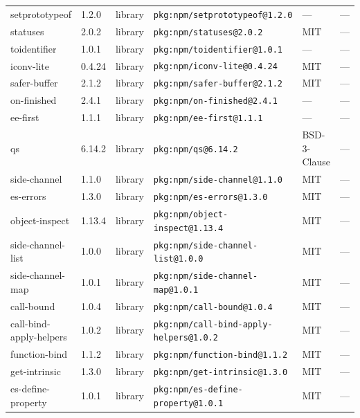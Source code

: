 \documentclass[11pt,a4paper]{article}
\begin{document}
\begin{longtable}{|p{4cm}|p{2cm}|p{1.6cm}|p{5cm}|p{1.5cm}|p{3.5cm}|}
\raggedright setprototypeof & 1.2.0 & library & \small\texttt{pkg:npm/setprototypeof@1.2.0} & — & \small — \\
\raggedright statuses & 2.0.2 & library & \small\texttt{pkg:npm/statuses@2.0.2} & MIT & \small — \\
\raggedright toidentifier & 1.0.1 & library & \small\texttt{pkg:npm/toidentifier@1.0.1} & — & \small — \\
\raggedright iconv-lite & 0.4.24 & library & \small\texttt{pkg:npm/iconv-lite@0.4.24} & MIT & \small — \\
\raggedright safer-buffer & 2.1.2 & library & \small\texttt{pkg:npm/safer-buffer@2.1.2} & MIT & \small — \\
\raggedright on-finished & 2.4.1 & library & \small\texttt{pkg:npm/on-finished@2.4.1} & — & \small — \\
\raggedright ee-first & 1.1.1 & library & \small\texttt{pkg:npm/ee-first@1.1.1} & — & \small — \\
\raggedright qs & 6.14.2 & library & \small\texttt{pkg:npm/qs@6.14.2} & BSD-3-Clause & \small — \\
\raggedright side-channel & 1.1.0 & library & \small\texttt{pkg:npm/side-channel@1.1.0} & MIT & \small — \\
\raggedright es-errors & 1.3.0 & library & \small\texttt{pkg:npm/es-errors@1.3.0} & MIT & \small — \\
\raggedright object-inspect & 1.13.4 & library & \small\texttt{pkg:npm/object-inspect@1.13.4} & MIT & \small — \\
\raggedright side-channel-list & 1.0.0 & library & \small\texttt{pkg:npm/side-channel-list@1.0.0} & MIT & \small — \\
\raggedright side-channel-map & 1.0.1 & library & \small\texttt{pkg:npm/side-channel-map@1.0.1} & MIT & \small — \\
\raggedright call-bound & 1.0.4 & library & \small\texttt{pkg:npm/call-bound@1.0.4} & MIT & \small — \\
\raggedright call-bind-apply-helpers & 1.0.2 & library & \small\texttt{pkg:npm/call-bind-apply-helpers@1.0.2} & MIT & \small — \\
\raggedright function-bind & 1.1.2 & library & \small\texttt{pkg:npm/function-bind@1.1.2} & MIT & \small — \\
\raggedright get-intrinsic & 1.3.0 & library & \small\texttt{pkg:npm/get-intrinsic@1.3.0} & MIT & \small — \\
\raggedright es-define-property & 1.0.1 & library & \small\texttt{pkg:npm/es-define-property@1.0.1} & MIT & \small — \\

\end{longtable}
\end{document}
